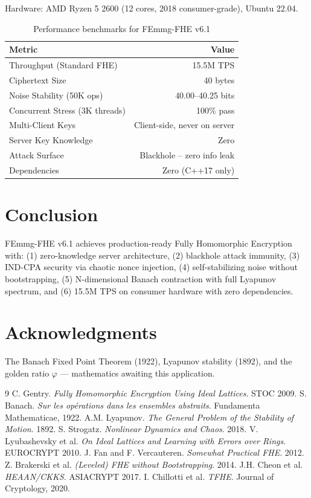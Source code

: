 \documentclass{article}
\begin{document}
Hardware: AMD Ryzen 5 2600 (12 cores, 2018 consumer-grade), Ubuntu 22.04.

\begin{table}[h]
\centering
\begin{tabular}{|l|r|}
\hline
\textbf{Metric} & \textbf{Value} \\
\hline
Throughput (Standard FHE) & 15.5M TPS \\
Ciphertext Size & 40 bytes \\
Noise Stability (50K ops) & 40.00--40.25 bits \\
Concurrent Stress (3K threads) & 100\% pass \\
Multi-Client Keys & Client-side, never on server \\
Server Key Knowledge & Zero \\
Attack Surface & Blackhole -- zero info leak \\
Dependencies & Zero (C++17 only) \\
\hline
\end{tabular}
\caption{Performance benchmarks for FEmmg-FHE v6.1}
\end{table}

\section{Conclusion}

FEmmg-FHE v6.1 achieves production-ready Fully Homomorphic Encryption with: (1) zero-knowledge server architecture, (2) blackhole attack immunity, (3) IND-CPA security via chaotic nonce injection, (4) self-stabilizing noise without bootstrapping, (5) N-dimensional Banach contraction with full Lyapunov spectrum, and (6) 15.5M TPS on consumer hardware with zero dependencies.

\section*{Acknowledgments}
The Banach Fixed Point Theorem (1922), Lyapunov stability (1892), and the golden ratio $\varphi$ — mathematics awaiting this application.

\begin{thebibliography}{9}
 C. Gentry. \textit{Fully Homomorphic Encryption Using Ideal Lattices}. STOC 2009.
 S. Banach. \textit{Sur les op\'erations dans les ensembles abstraits}. Fundamenta Mathematicae, 1922.
 A.M. Lyapunov. \textit{The General Problem of the Stability of Motion}. 1892.
 S. Strogatz. \textit{Nonlinear Dynamics and Chaos}. 2018.
 V. Lyubashevsky et al. \textit{On Ideal Lattices and Learning with Errors over Rings}. EUROCRYPT 2010.
 J. Fan and F. Vercauteren. \textit{Somewhat Practical FHE}. 2012.
 Z. Brakerski et al. \textit{(Leveled) FHE without Bootstrapping}. 2014.
 J.H. Cheon et al. \textit{HEAAN/CKKS}. ASIACRYPT 2017.
 I. Chillotti et al. \textit{TFHE}. Journal of Cryptology, 2020.
\end{thebibliography}
\end{document}
